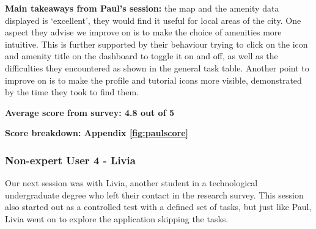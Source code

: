 \textbf{Main takeaways from Paul's session: }the map and the amenity data
displayed is `excellent', they would find it useful for local areas of the city.
One aspect they advise we improve on is to make the choice of amenities more
intuitive. This is further supported by their behaviour trying to click on the
icon and amenity title on the dashboard to toggle it on and off, as well as the
difficulties they encountered as shown in the general task table. Another point
to improve on is to make the profile and tutorial icons more visible,
demonstrated by the time they took to find them.

\noindent\textbf{Average score from survey: 4.8 out of 5}

\textbf{Score breakdown: Appendix \ref{fig:paulscore}}

\newpage{}

\subsubsection{Non-expert User 4 - Livia}
Our next session was with Livia, another student in a technological
undergraduate degree  who left their contact in the research survey. This
session also started out as a controlled test with a defined set of tasks, but
just like Paul, Livia went on to explore the application skipping the tasks.

